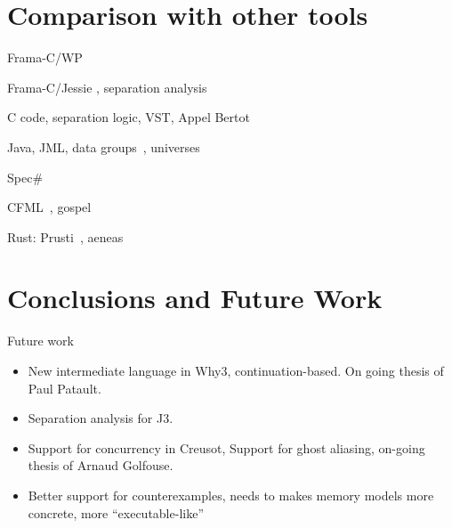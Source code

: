 \documentclass[a4paper,twoside]{article}
\begin{document}
\section{Comparison with other tools}

Frama-C/WP~

Frama-C/Jessie , separation analysis~\cite{hubert2008these,hubert07hav}

C code, separation logic, VST, Appel Bertot

Java, JML, data groups~\cite{breunesse03ftfjp}, universes~\cite{Dietl05jot}

Spec\# ~\cite{BarnettLS04}

CFML~\cite{chargueraud08icfp}, gospel~\cite{gospelfm19}

Rust: Prusti~\cite{astrauskas19oopsla}, aeneas~\cite{ho22icfp}

\section{Conclusions and Future Work}

Future work
\begin{itemize}
\item New intermediate language in Why3, continuation-based. On going thesis of
  Paul Patault.
\item Separation analysis for J3.
\item Support for concurrency in Creusot, Support for ghost aliasing, on-going
  thesis of Arnaud Golfouse.
\item Better support for counterexamples, needs to makes memory models more
  concrete, more ``executable-like''
\end{itemize}


%


\end{document}
